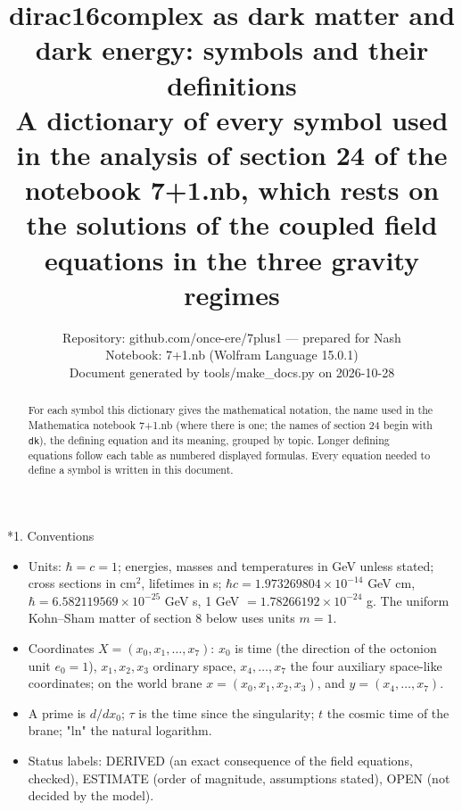 \documentclass[10pt,a4paper]{article}
\makeatletter
\renewcommand\section{\@startsection{section}{1}{\z@}{-3.5ex \@plus -1ex \@minus -.2ex}{2.3ex \@plus.2ex}{\normalfont\Large\bfseries\raggedright}}
\makeatother
\begin{document}
\title{dirac16complex as dark matter and dark energy: symbols and their definitions\\[0.4em]\large A dictionary of every symbol used in the analysis of section 24 of the notebook 7+1.nb, which rests on the solutions of the coupled field equations in the three gravity regimes}
\author{Repository: github.com/once-ere/7plus1 — prepared for Nash\\ Notebook: 7+1.nb (Wolfram Language 15.0.1)\\ Document generated by tools/make\_docs.py on 2026-10-28}
\date{}
\maketitle
\begin{abstract}
For each symbol this dictionary gives the mathematical notation, the name used in the Mathematica notebook 7+1.nb (where there is one; the names of section 24 begin with \texttt{dk}), the defining equation and its meaning, grouped by topic. Longer defining equations follow each table as numbered displayed formulas. Every equation needed to define a symbol is written in this document.
\end{abstract}
\tableofcontents
{}\section*{1. Conventions}
\begin{itemize}
\item Units: $\hbar=c=1$; energies, masses and temperatures in GeV unless stated; cross sections in cm$^2$, lifetimes in s; $\hbar c=1.973269804\times10^{-14}$ GeV cm, $\hbar=6.582119569\times10^{-25}$ GeV s, 1 GeV $=1.78266192\times10^{-24}$ g. The uniform Kohn–Sham matter of section 8 below uses units $m=1$.
\item Coordinates $X=(x_0,x_1,\dots,x_7)$: $x_0$ is time (the direction of the octonion unit $e_0=1$), $x_1,x_2,x_3$ ordinary space, $x_4,\dots,x_7$ the four auxiliary space-like coordinates; on the world brane $x=(x_0,x_1,x_2,x_3)$, and $y=(x_4,\dots,x_7)$.
\item A prime is $d/dx_0$; $\tau$ is the time since the singularity; $t$ the cosmic time of the brane; "ln" the natural logarithm.
\item Status labels: DERIVED (an exact consequence of the field equations, checked), ESTIMATE (order of magnitude, assumptions stated), OPEN (not decided by the model).
\end{itemize}
\end{document}
